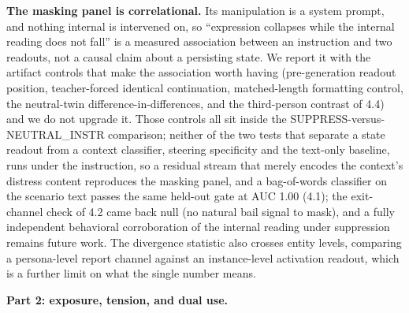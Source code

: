 \documentclass[11pt,a4paper]{article}
\begin{document}
\textbf{The masking panel is correlational.} Its manipulation is a system prompt, and nothing internal is intervened on, so ``expression collapses while the internal reading does not fall'' is a measured association between an instruction and two readouts, not a causal claim about a persisting state. We report it with the artifact controls that make the association worth having (pre-generation readout position, teacher-forced identical continuation, matched-length formatting control, the neutral-twin difference-in-differences, and the third-person contrast of 4.4) and we do not upgrade it. Those controls all sit inside the SUPPRESS-versus-NEUTRAL\_INSTR comparison; neither of the two tests that separate a state readout from a context classifier, steering specificity and the text-only baseline, runs under the instruction, so a residual stream that merely encodes the context's distress content reproduces the masking panel, and a bag-of-words classifier on the scenario text passes the same held-out gate at AUC 1.00 (4.1); the exit-channel check of 4.2 came back null (no natural bail signal to mask), and a fully independent behavioral corroboration of the internal reading under suppression remains future work. The divergence statistic also crosses entity levels, comparing a persona-level report channel against an instance-level activation readout, which is a further limit on what the single number means.

\textbf{Part 2: exposure, tension, and dual use.}
\end{document}
